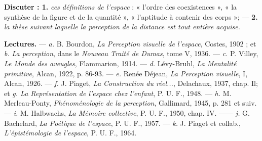 {\bf Discuter : 1.} {\it ces définitions de l’espace} : « l’ordre des coexistences », « la
synthèse de la figure et de la quantité », « l’aptitude à contenir des corps »;
— {\bf 2.} {\it la thèse suivant laquelle la perception de la distance est tout entière
acquise.}

{\bf Lectures.} — {\it a.} B. Bourdon, {\it La Perception visuelle de l'espace}, Costes,
1902 ; et {\it b.} {\it La perception}, dans le {\it Nouveau Traité de Dumas}, tome V, 1936.
— {\it c.} P. Villey, {\it Le Monde des aveugles}, Flammarion, 1914. — {\it d.} Lévy-Bruhl,
{\it La Mentalité primitive}, Alcan, 1922, p. 86-93. — {\it e.} Renée Déjean,
{\it La Perception visuelle}, I, Alcan, 1926. — {\it f.} J. Piaget, {\it La Construction
du réel...}, Delachaux, 1937, chap. Il; et {\it g. La Représentation de l'espace
chez l'enfant}, P. U. F., 1948. — {\it h.} M. Merleau-Ponty, {\it Phénoménologie
de la perception}, Gallimard, 1945, p. 281 et suiv. — {\it i.} M. Halbwachs,
{\it La Mémoire collective}, P. U. F., 1950, chap. IV. —— {\it j.} G. Bachelard, {\it La
Poétique de l'espace}, P. U. F., 1957. — {\it k.} J. Piaget et collab., {\it L'épistémologie
de l’espace}, P. U. F., 1964.

